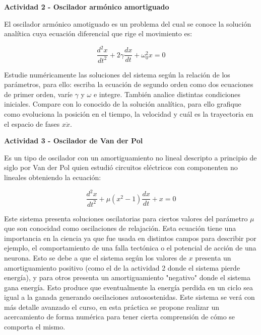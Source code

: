 \documentclass[a4paper,12pt]{article}
\begin{document}
{\Large \textbf{Actividad 2 - Oscilador arm\'onico amortiguado}}

El oscilador arm\'onico amotiguado es un problema del cual se conoce la soluci\'on anal\'itica cuya ecuaci\'on diferencial que rige el movimiento es:

\begin{equation}
	\frac{d^2 x}{dt^2} + 2\gamma\frac{dx}{dt} + \omega_0^2x = 0
\end{equation}

Estudie num\'ericamente las soluciones del sistema seg\'un la relaci\'on de los par\'ametros, para ello: escriba la ecuaci\'on de segundo orden como dos ecuaciones de primer orden, var\'ie $\gamma$ y $\omega$ e integre. Tambi\'en analice distintas condiciones iniciales. Compare con lo conocido de la soluci\'on anal\'itica, para ello grafique como evoluciona la posici\'on en el tiempo, la velocidad y cu\'al es la trayectoria en el espacio de fases $x  \ddot{x}$.\newline


{\Large \textbf{Actividad 3 - Oscilador de Van der Pol}}

Es un tipo de oscilador con un amortiguamiento no lineal descripto a principio de siglo por Van der Pol quien estudi\'o circuitos el\'ectricos con componenten no lineales obteniendo la ecuaci\'on:

\begin{equation}
	\frac{d^2 x}{dt^2} + \mu(x^2-1)\frac{dx}{dt} + x = 0
\end{equation}

Este sistema presenta soluciones oscilatorias para ciertos valores del par\'ametro $\mu$ que son conocidad como oscilaciones de relajaci\'on. Esta ecuaci\'on tiene una importancia en la ciencia ya que fue usada en distintos campos para describir por ejemplo, el comportamiento de una falla tect\'onica o el potencial de acci\'on de una neurona. Esto se debe a que el sistema seg\'un los valores de $x$ presenta un amortiguamiento positivo (como el de la actividad 2 donde el sistema pierde energ\'ia), y para otros presenta un amortiguamiento "negativo" donde el sistema gana energ\'ia. Esto produce que eventualmente la energ\'ia perdida en un ciclo sea igual a la ganada generando oscilaciones autosostenidas. Este sistema se ver\'a con m\'as detalle avanzado el curso, en esta pr\'actica se propone realizar un acercamiento de forma num\'erica para tener cierta comprensi\'on de c\'omo se comporta el mismo.
\end{document}
